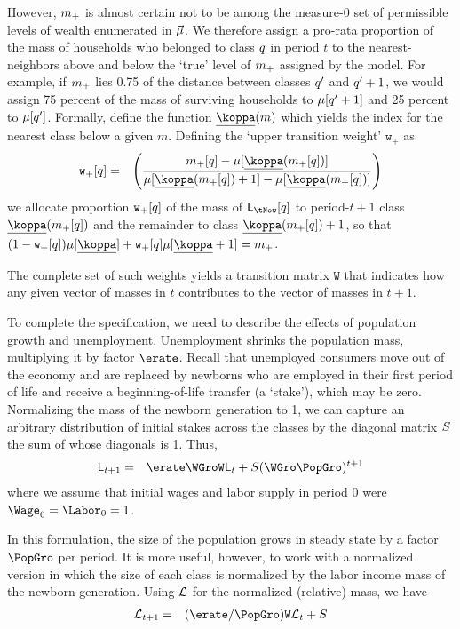 \documentclass{handout}
\begin{document}
\renewcommand{\weight}{\texttt{w}_{+}}
\newcommand{\Weight}{\texttt{W}}

However, $m_{+}$ is almost certain not to be among the measure-0 set of permissible levels of wealth
enumerated in $\vec{\mu}$.  We therefore assign a pro-rata proportion
of the mass of households who belonged to class $q$ in period $t$ to the nearest-neighbors
above and below the `true' level of $m_{+}$ assigned by the model.  For 
example, if $m_{+}$ lies 0.75 of the distance between classes $q'$ and $q'+1$,
we would assign 75 percent of the mass of surviving households to $\mu[q'+1]$ and 
25 percent to $\mu[q']$.  Formally, define the function $\uKoppa(m)$ which
yields the index for the nearest class below a given $m$.  Defining the `upper transition weight' 
$\weight$ as 
\begin{eqnarray}
 \weight[\class] & = & \left(\frac{\mqNext[\class]-\mclass[\uKoppa(\mqNext[\class])]}{
\mclass[\uKoppa(\mqNext[\class])+1]-\mclass[\uKoppa(\mqNext[\class])]}\right)
\end{eqnarray}
we allocate proportion $\weight[\class]$ of the mass of $\LMass_{\tNow}[\class]$ to 
period-$t+1$ class $\uKoppa(\mqNext[\class])$ and the remainder to class $\uKoppa(\mqNext[\class])+1$, so that $(1-\weight[q]) \mclass[\uKoppa]+\weight[q]\mclass[\uKoppa+1] = \mqNext$.

The complete set of such weights yields a transition matrix $\Weight$ that indicates how any
given vector of masses in $t$ contributes to the vector of masses in $t+1$.  

To complete the specification, we need to describe the effects of
population growth and unemployment.  Unemployment shrinks the
population mass, multiplying it by factor $\erate$.  Recall that
unemployed consumers move out of the economy and are replaced by
newborns who are employed in their first period of life and receive a
beginning-of-life transfer (a `stake'), which may be zero.
Normalizing the mass of the newborn generation to 1, we can capture an
arbitrary distribution of initial stakes across the classes by the
diagonal matrix $S$ the sum of whose diagonals is 1.  Thus,
\begin{eqnarray}
  \LMass_{t+1} & = & \erate \WGro \Weight \LMass_{t} + \Stake (\WGro \PopGro)^{t+1}
\end{eqnarray}
where we assume that initial wages and labor supply in period 0 were $\Wage_{0}=\Labor_{0}=1$.


In this formulation, the size of the population grows in steady state by a factor $\PopGro$ per
period.  It is more useful, however, to work with a normalized version in which the size of each 
class is normalized by the labor income mass of the newborn generation.  
Using $\mathcal{L}$ for the normalized (relative) mass, we have 
\begin{eqnarray}
  \lmass_{t+1} & = & (\erate/\PopGro) \Weight \lmass_{t} + \Stake
\end{eqnarray}





\end{document}
